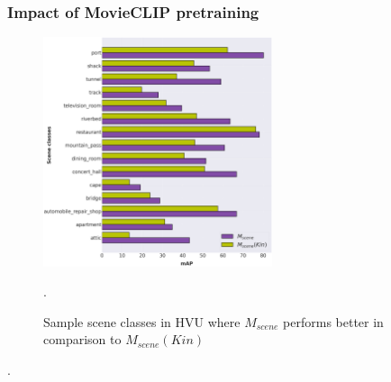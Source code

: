 \subsubsection{Impact of MovieCLIP pretraining}
\begin{figure}[h!]
    \centering
    \includegraphics[width=0.6\textwidth]{figures/scene_gt_base_model_updated_legend.png}
    \caption{Sample scene classes in HVU where $M_{scene}$ performs better in comparison to $M_{scene}(Kin)$}. 
    \label{scenegtbase}
\end{figure}
\begin{table}[h!]
\centering
{}
\vspace{3mm}
\caption{Impact of MovieCLIP pretrained features vs Kinetics pretrained features for $M_{scene}$ (HVU) and $M_{trailer}$ (Moviescope). Results reported are mean average precision (\textbf{mAP}) values. $Model(Kin)$: Model with Kinetics400 pretrained features, where $Model \in \{M_{scene},M_{trailer}\}$ }
\label{pretrain table}.
\end{table}
